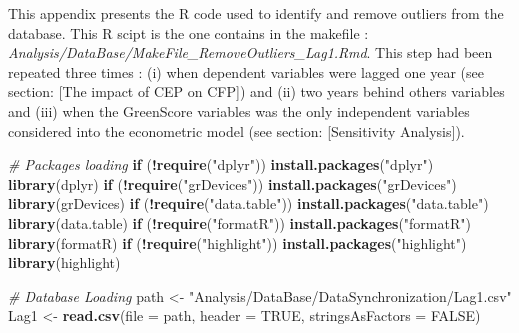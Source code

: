 \documentclass[]{article}
\title{}
\author{}
\date{}
\newenvironment{Shaded}{\begin{snugshade}}{\end{snugshade}}
\newcommand{\KeywordTok}[1]{\textcolor[rgb]{0.13,0.29,0.53}{\textbf{#1}}}
\newcommand{\DataTypeTok}[1]{\textcolor[rgb]{0.13,0.29,0.53}{#1}}
\newcommand{\StringTok}[1]{\textcolor[rgb]{0.31,0.60,0.02}{#1}}
\newcommand{\CommentTok}[1]{\textcolor[rgb]{0.56,0.35,0.01}{\textit{#1}}}
\newcommand{\OtherTok}[1]{\textcolor[rgb]{0.56,0.35,0.01}{#1}}
\newcommand{\ControlFlowTok}[1]{\textcolor[rgb]{0.13,0.29,0.53}{\textbf{#1}}}
\newcommand{\OperatorTok}[1]{\textcolor[rgb]{0.81,0.36,0.00}{\textbf{#1}}}
\newcommand{\NormalTok}[1]{#1}
\begin{document}
\pagecolor{apricot} This appendix presents the R code used to identify
and remove outliers from the database. This R scipt is the one contains
in the makefile :
\emph{Analysis/DataBase/MakeFile\_RemoveOutliers\_Lag1.Rmd}. This step
had been repeated three times : (i) when dependent variables were lagged
one year (see section: {[}The impact of CEP on CFP{]}) and (ii) two
years behind others variables and (iii) when the GreenScore variables
was the only independent variables considered into the econometric model
(see section: {[}Sensitivity Analysis{]}).

\begin{Shaded}
\begin{Highlighting}[]
\CommentTok{# Packages loading}
\ControlFlowTok{if}\NormalTok{ (}\OperatorTok{!}\KeywordTok{require}\NormalTok{(}\StringTok{"dplyr"}\NormalTok{)) }\KeywordTok{install.packages}\NormalTok{(}\StringTok{"dplyr"}\NormalTok{)}
\KeywordTok{library}\NormalTok{(dplyr)}
\ControlFlowTok{if}\NormalTok{ (}\OperatorTok{!}\KeywordTok{require}\NormalTok{(}\StringTok{"grDevices"}\NormalTok{)) }\KeywordTok{install.packages}\NormalTok{(}\StringTok{"grDevices"}\NormalTok{)}
\KeywordTok{library}\NormalTok{(grDevices)}
\ControlFlowTok{if}\NormalTok{ (}\OperatorTok{!}\KeywordTok{require}\NormalTok{(}\StringTok{"data.table"}\NormalTok{)) }\KeywordTok{install.packages}\NormalTok{(}\StringTok{"data.table"}\NormalTok{)}
\KeywordTok{library}\NormalTok{(data.table)}
\ControlFlowTok{if}\NormalTok{ (}\OperatorTok{!}\KeywordTok{require}\NormalTok{(}\StringTok{"formatR"}\NormalTok{)) }\KeywordTok{install.packages}\NormalTok{(}\StringTok{"formatR"}\NormalTok{)}
\KeywordTok{library}\NormalTok{(formatR)}
\ControlFlowTok{if}\NormalTok{ (}\OperatorTok{!}\KeywordTok{require}\NormalTok{(}\StringTok{"highlight"}\NormalTok{)) }\KeywordTok{install.packages}\NormalTok{(}\StringTok{"highlight"}\NormalTok{)}
\KeywordTok{library}\NormalTok{(highlight)}
\end{Highlighting}
\end{Shaded}

\begin{Shaded}
\begin{Highlighting}[]
\CommentTok{# Database Loading}
\NormalTok{path <-}\StringTok{ "Analysis/DataBase/DataSynchronization/Lag1.csv"}
\NormalTok{Lag1 <-}\StringTok{ }\KeywordTok{read.csv}\NormalTok{(}\DataTypeTok{file =}\NormalTok{ path, }\DataTypeTok{header =} \OtherTok{TRUE}\NormalTok{, }\DataTypeTok{stringsAsFactors =} \OtherTok{FALSE}\NormalTok{)}
\end{Highlighting}
\end{Shaded}
\end{document}
